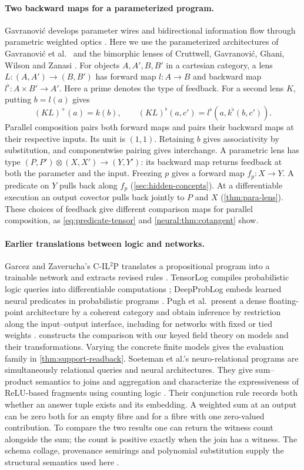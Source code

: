 \documentclass[11pt,a4paper]{article}
\theoremstyle{definition}
\theoremstyle{remark}\newaliascnt{remark}{theorem}
\numberwithin{equation}{section}
\begin{document}
\paragraph{Two backward maps for a parameterized program.}
Gavranovi\'c develops parameter wires and bidirectional information flow through parametric weighted optics \cite{gavranovic-thesis}. Here we use the parameterized architectures of Gavranovi\'c et al.\ \cite{cdl} and the bimorphic lenses of Cruttwell, Gavranovi\'c, Ghani, Wilson and Zanasi \cite{lens:deep}. For objects \(A,A',B,B'\) in a cartesian category, a lens \(L:(A,A')\to(B,B')\) has forward map \(l:A\to B\) and backward map \(l^\flat:A\times B'\to A'\). Here a prime denotes the type of feedback. For a second lens \(K\), putting \(b=l(a)\) gives
\[
 (KL)^+(a)=k(b),\qquad (KL)^\flat(a,c')=l^\flat(a,k^\flat(b,c')) .
\]
Parallel composition pairs both forward maps and pairs their backward maps at their respective inputs. Its unit is \((1,1)\). Retaining \(b\) gives associativity by substitution, and componentwise pairing gives interchange. A parametric lens has type
\((P,P')\otimes(X,X')\to(Y,Y')\): its backward map returns feedback at both the parameter and the input. Freezing \(p\) gives a forward map \(f_p:X\to Y\). A predicate on \(Y\) pulls back along \(f_p\) (\cref{sec:hidden-concepts}). At a differentiable execution an output covector pulls back jointly to \(P\) and \(X\) (\cref{thm:para-lens}). These choices of feedback give different comparison maps for parallel composition, as \eqref{eq:predicate-tensor} and \cref{neural:thm:cotangent} show.
\paragraph{Earlier translations between logic and networks.}
Garcez and Zaverucha's C-IL$^2$P translates a propositional program into a trainable network and extracts revised rules \cite{cil2p}. TensorLog compiles probabilistic logic queries into differentiable computations \cite{tensorlog}; DeepProbLog embeds learned neural predicates in probabilistic programs \cite{deepproblog}. Pugh et al.\ present a dense floating-point architecture by a coherent category and obtain inference by restriction along the input--output interface, including for networks with fixed or tied weights \cite[Theorems 4.13--4.14]{pugh}.  constructs the comparison with our keyed field theory on models and their transformations. Varying the concrete finite models gives the evaluation family in \cref{thm:support-readback}. Soeteman et al.'s neuro-relational programs are simultaneously relational queries and neural architectures. They give sum--product semantics to joins and aggregation and characterize the expressiveness of ReLU-based fragments using counting logic \cite{nrp}. Their conjunction rule records both whether an answer tuple exists and its embedding. A weighted sum at an output can be zero both for an empty fibre and for a fibre with one zero-valued contribution. To compare the two results one can return the witness count alongside the sum; the count is positive exactly when the join has a witness. The schema collage, provenance semirings and polynomial substitution supply the structural semantics used here \cite{algebraic-databases,green-provenance,poly:gambino-kock}.
\end{document}

